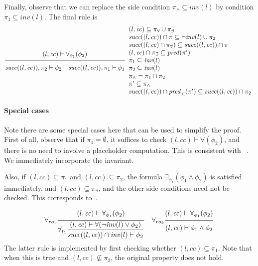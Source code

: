 \documentclass{article}
\newcommand{\proofrule}[3][]{#1 \frac{\raisebox{.7ex}{\normalsize{$#2$}}}
  {\raisebox{-1.0ex}{\normalsize{$#3$}}}}
\newcommand{\placeholder}[1][]{\pi_{#1}}
\newcommand{\loc}{l}
\newcommand{\region}{\mathit{cc}}
\newcommand{\suc}{\mathit{succ}}
\newcommand{\pre}{\mathit{pred}}
\newcommand{\inv}{\mathit{inv}}
\begin{document}
Finally, observe that we can replace the side condition $\placeholder[\land] \subseteq \inv(\loc)$ by condition $\placeholder[1] \subseteq \inv(\loc)$. The final rule is
\[
\proofrule
{(\loc, \region) \vdash \forall_{\phi_1}(\phi_2)}
{
  \suc((\loc, \region)), \placeholder[2] \vdash \phi_2
  \quad \suc((\loc, \region)), \placeholder[1] \vdash \phi_1
}
\begin{array}{l}
  (\loc, \region) \subseteq \placeholder[\forall] \cup \placeholder[\exists] \\
  \suc((\loc, \region)) \cap \placeholder \subseteq \lnot \inv(\loc) \cup \placeholder[2]\\
  \suc((\loc, \region) \cap \placeholder[\forall]) \subseteq \suc((\loc, \region)) \cap \placeholder \\
  (\loc, \region) \cap \placeholder[\exists] \subseteq \pre(\placeholder') \\
  \placeholder[1] \subseteq \inv(\loc) \\
  \placeholder[2] \subseteq \inv(\loc) \\
  \placeholder[\land] = \placeholder[1] \cap \placeholder[2] \\
  \placeholder' \subseteq \placeholder[\land] \\
  \suc((\loc, \region)) \cap \pre_{<}(\placeholder') \subseteq \suc((\loc, \region)) \cap \placeholder[2]
\end{array}
\]


\paragraph{Special cases}
Note there are some special cases here that can be used to simplify the proof. First of all, observe that if $\placeholder[1] = \emptyset$, it suffices to check
$(\loc, \region) \vdash \forall(\phi_2)$, and there is no need to involve a placeholder computation. This is consistent with ~\cite[proof rule $\forall_{ro_1}$]{FC:14report}. We immediately incorporate the invariant.

Also, if $(\loc, \region) \subseteq \placeholder[1]$ and $(\loc, \region) \subseteq \placeholder[2]$, the formula $\exists_{\phi_1}(\phi_1 \land \phi_2)$ is satisfied immediately, and $(\loc, \region) \subseteq \placeholder[\exists]$, and the other side conditions need not be checked. This corresponds to~\cite[proof rule $\forall_{ro_2}$]{FC:14}.

\[
\proofrule[\forall_{ro_1}]
{(\loc, \region) \vdash \forall_{\phi_1}(\phi_2)}
{ \proofrule[\forall_{t_1}]
  {(\loc, \region) \vdash \forall(\lnot \inv(\loc) \lor \phi_2)}
  {\suc((\loc, \region)) \cap \inv(\loc) \vdash \phi_2}
}
\quad
\proofrule[\forall_{ro_2}]
{(\loc, \region) \vdash \forall_{\phi_1}(\phi_2)}
{(\loc, \region) \vdash \phi_1 \land \phi_2}
\]
The latter rule is implemented by first checking whether $(\loc, \region) \subseteq \placeholder[1]$. Note that when this is true and $(\loc, \region) \not \subseteq \placeholder[2]$, the original property does not hold.
\end{document}
